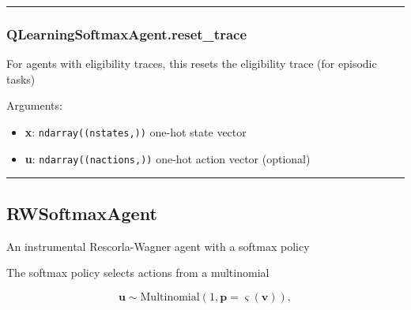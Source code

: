 \begin{center}\rule{0.5\linewidth}{\linethickness}\end{center}

\hypertarget{qlearningsoftmaxagent.reset_trace}{%
\subsubsection{QLearningSoftmaxAgent.reset\_trace}\label{qlearningsoftmaxagent.reset_trace}}

\begin{Shaded}
\begin{Highlighting}[]
\OperatorTok{=}\NormalTok{)}
\end{Highlighting}
\end{Shaded}

For agents with eligibility traces, this resets the eligibility trace
(for episodic tasks)

Arguments:

\begin{itemize}
\tightlist
\item
  \textbf{x}: \texttt{ndarray((nstates,))} one-hot state vector
\item
  \textbf{u}: \texttt{ndarray((nactions,))} one-hot action vector
  (optional)
\end{itemize}

\begin{center}\rule{0.5\linewidth}{\linethickness}\end{center}

\hypertarget{rwsoftmaxagent}{%
\subsection{RWSoftmaxAgent}\label{rwsoftmaxagent}}

\begin{Shaded}
\begin{Highlighting}[]
\end{Highlighting}
\end{Shaded}

An instrumental Rescorla-Wagner agent with a softmax policy

The softmax policy selects actions from a multinomial

\[
\mathbf u \sim \mathrm{Multinomial}(1, \mathbf p=\varsigma(\mathbf v)),
\]

